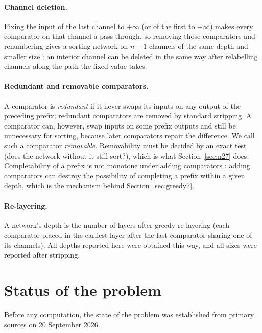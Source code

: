\documentclass[11pt,a4paper]{article}
\theoremstyle{plain}
\theoremstyle{definition}
\theoremstyle{remark}
\begin{document}
\paragraph{Channel deletion.} Fixing the input of the last channel to $+\infty$ (or of the first to $-\infty$) makes every comparator on that channel a pass-through, so removing those comparators and renumbering gives a sorting network on $n-1$ channels of the same depth and smaller size \cite[\S5.3.4]{Knuth}; an interior channel can be deleted in the same way after relabelling channels along the path the fixed value takes.

\paragraph{Redundant and removable comparators.} A comparator is \emph{redundant} if it never swaps its inputs on any output of the preceding prefix; redundant comparators are removed by standard stripping. A comparator can, however, swap inputs on some prefix outputs and still be unnecessary for sorting, because later comparators repair the difference. We call such a comparator \emph{removable}. Removability must be decided by an exact test (does the network without it still sort?), which is what Section~\ref{sec:n27} does. Completability of a prefix is not monotone under adding comparators \cite[\S5.3.4, exercise~21]{Knuth}: adding comparators can destroy the possibility of completing a prefix within a given depth, which is the mechanism behind Section~\ref{sec:greedy7}.

\paragraph{Re-layering.} A network's depth is the number of layers after greedy re-layering (each comparator placed in the earliest layer after the last comparator sharing one of its channels). All depths reported here were obtained this way, and all sizes were reported after stripping.

\section{Status of the problem}\label{sec:status}

Before any computation, the state of the problem was established from primary sources on 20 September 2026.
\end{document}
